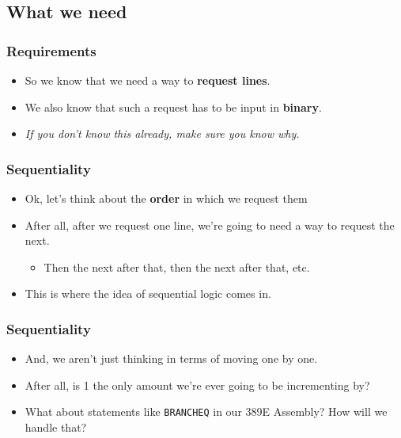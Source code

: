 \documentclass{beamer}
\begin{document}
\begin{frame}

    			

    			
    		\end{frame}
    	
	\subsection{What we need}    	
    	
    	\begin{frame}
    		\frametitle{Requirements}
    		\begin{itemize}
    			\item So we know that we need a way to \textbf{request lines}.
    			\item We also know that such a request has to be input in \textbf{binary}.
    			\item \textit{If you don't know this already, make sure you know why.}
    		\end{itemize}
    	\end{frame}
    	
    	\begin{frame}
    		\frametitle{Sequentiality}
    		\begin{itemize}
    			\item Ok, let's think about the \textbf{order} in which we request them
    			\item After all, after we request one line, we're going to need a way to request the next.
    			\begin{itemize}
    				\item Then the next after that, then the next after that, etc.
    			\end{itemize}
    			\item This is where the idea of sequential logic comes in.
    		\end{itemize}
    	\end{frame}
    	
    	\begin{frame}
    		\frametitle{Sequentiality}
    		\begin{itemize}
    			\item And, we aren't just thinking in terms of moving one by one.
    			\item After all, is 1 the only amount we're ever going to be incrementing by?
    			\item What about statements like \texttt{BRANCHEQ} in our 389E Assembly? How will we handle that?
    			
    		\end{itemize}
    	\end{frame}
    	
\end{document}
